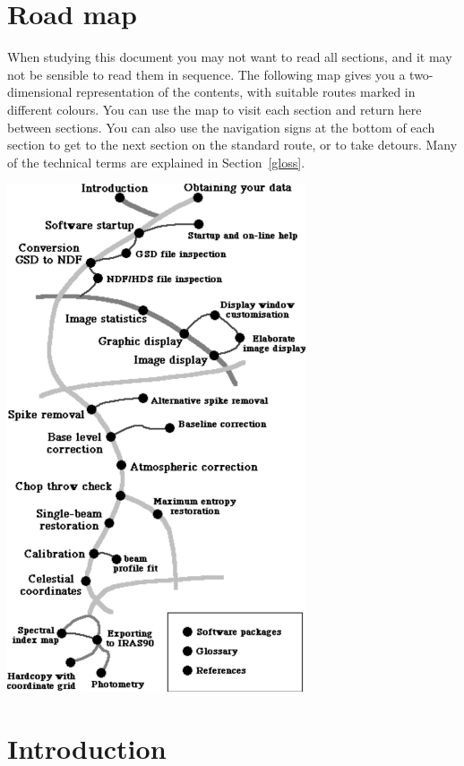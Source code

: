 \documentclass[11pt,noabs]{starlink}
\begin{document}
\scfrontmatter

\section{\label{roadmap}Road map}



   When studying this document you may not want to read all sections,
   and it may not be sensible to read them in sequence. The following
   map gives you a two-dimensional representation of the contents, with
   suitable routes marked in different colours. You can use the map to
   visit each section and return here between sections. You can
   also use the navigation signs at the bottom of each section to
   get to the next section on the standard route, or to take detours.
   Many of the technical terms are explained in
Section~\ref{gloss}.

\begin{center}
\leavevmode\includegraphics[height=150mm]{sc1_cont}
\end{center}

\section{\label{intro}Introduction}
\end{document}
